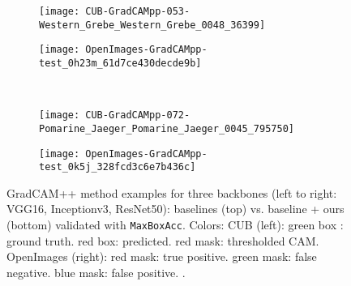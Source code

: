 \documentclass[twocolumn]{article}
\newcommand\maxboxacc{\texttt{MaxBoxAcc}\xspace}
\theoremstyle{definition}
\begin{document}
\begin{figure*}
\begin{subfigure}[b]{0.49\textwidth}
         \centering
         \texttt{[image: CUB-GradCAMpp-053-Western\_Grebe\_Western\_Grebe\_0048\_36399]}
     \end{subfigure}
     \hfill
     \begin{subfigure}[b]{0.49\textwidth}
         \centering
         \texttt{[image: OpenImages-GradCAMpp-test\_0h23m\_61d7ce430decde9b]}
     \end{subfigure}
     \\
     \vspace{0.1cm}
     \begin{subfigure}[b]{0.49\textwidth}
         \centering
         \texttt{[image: CUB-GradCAMpp-072-Pomarine\_Jaeger\_Pomarine\_Jaeger\_0045\_795750]}
     \end{subfigure}
     \hfill
     \begin{subfigure}[b]{0.49\textwidth}
         \centering
         \texttt{[image: OpenImages-GradCAMpp-test\_0k5j\_328fcd3c6e7b436c]}
     \end{subfigure}
        \caption{GradCAM++ method examples for three backbones (left to right: VGG16, Inceptionv3, ResNet50): baselines (top) vs. baseline + ours (bottom)  validated with \maxboxacc. Colors: CUB (left): green box : ground truth. red box: predicted. red mask: thresholded CAM. OpenImages (right): red mask: true positive. green mask: false negative. blue mask: false positive. .}
        \label{fig:gradcampp-cub-openim-example-pred}
\end{figure*}
\end{document}
